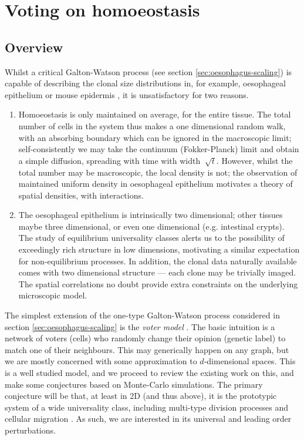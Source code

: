 \documentclass[10pt,english]{report}
\begin{document}
\chapter{Voting on homoeostasis}

\section{Overview}

Whilst a critical Galton-Watson process (see section \ref{sec:oesophagus-scaling}) is capable of describing the clonal size distributions in, for example, oesophageal epithelium or mouse epidermis  \citep{klein07}, it is unsatisfactory for two reasons.

\begin{enumerate}
\item Homoeostasis is only maintained on average, for the entire tissue. The total number of cells in the system thus makes a one dimensional random walk, with an absorbing boundary which can be ignored in the macroscopic limit; self-consistently we may take the continuum (Fokker-Planck) limit and obtain a simple diffusion, spreading with time with width $~\sqrt{t}$. However, whilst the total number may be macroscopic, the local density is not; the observation of maintained uniform density in oesophageal epithelium motivates a theory of spatial densities, with interactions.

\item The oesophageal epithelium is intrinsically two dimensional; other tissues maybe three dimensional, or even one dimensional (e.g. intestinal crypts). The study of equilibrium universality classes alerts us to the possibility of exceedingly rich structure in low dimensions, motivating a similar expectation for non-equilibrium processes. In addition, the clonal data naturally available comes with two dimensional structure --- each clone may be trivially imaged. The spatial correlations no doubt provide extra constraints on the underlying microscopic model.

\end{enumerate}

The simplest extension of the one-type Galton-Watson process considered in section \ref{sec:oesophagus-scaling} is the \emph{voter model} \citep[][chapter V]{liggettbook}. The basic intuition is a network of voters (cells) who randomly change their opinion (genetic label) to match one of their neighbours. This may generically happen on any graph, but we are mostly concerned with some approximation to $d$-dimensional spaces. This is a well studied model, and we proceed to review the existing work on this, and make some conjectures based on Monte-Carlo simulations. The primary conjecture will be that, at least in 2D (and thus above), it is the prototypic system of a wide universality class, including multi-type division processes and cellular migration \citep{klein08}. As such, we are interested in its universal and leading order perturbations.
\end{document}
